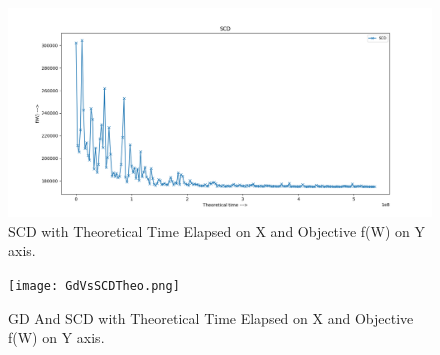 \documentclass[a4paper,11pt]{article}
\begin{document}
\begin{mlsolution}
\begin{figure}[th]%
\centering
\includegraphics[width=1.2\columnwidth]{SCD-theo.png}%

\caption{SCD with Theoretical Time Elapsed on X and Objective f(W) on Y axis.}%
\label{fig:SCD2}%
\end{figure}

\begin{figure}[th]%
\centering
\texttt{[image: GdVsSCDTheo.png]}%

\caption{GD And SCD with Theoretical Time Elapsed on X and Objective f(W) on Y axis.}%
\label{fig:GD4}%
\end{figure}

\end{mlsolution}
					
\end{document}
